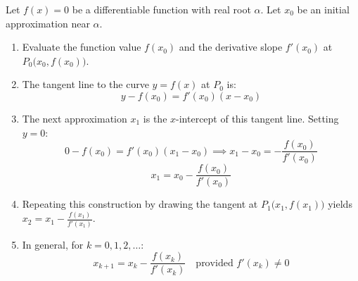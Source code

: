 \begin{theorembox}
Let $f(x) = 0$ be a differentiable function with real root $\alpha$. Let $x_0$ be an initial approximation near $\alpha$.
\begin{enumerate}
    \item Evaluate the function value $f(x_0)$ and the derivative slope $f'(x_0)$ at $P_0\big(x_0, f(x_0)\big)$.
    \item The tangent line to the curve $y = f(x)$ at $P_0$ is:
    \begin{equation}
        y - f(x_0) = f'(x_0)(x - x_0)
    \end{equation}
    \item The next approximation $x_1$ is the $x$-intercept of this tangent line. Setting $y = 0$:
    \begin{equation}
        0 - f(x_0) = f'(x_0)(x_1 - x_0) \implies x_1 - x_0 = -\frac{f(x_0)}{f'(x_0)}
    \end{equation}
    \begin{equation}
        \boxed{x_1 = x_0 - \frac{f(x_0)}{f'(x_0)}}
    \end{equation}
    \item Repeating this construction by drawing the tangent at $P_1\big(x_1, f(x_1)\big)$ yields $x_2 = x_1 - \frac{f(x_1)}{f'(x_1)}$.
    \item In general, for $k = 0, 1, 2, \dots$:
    \begin{equation}
        \boxed{x_{k+1} = x_k - \frac{f(x_k)}{f'(x_k)}} \quad \text{provided } f'(x_k) \ne 0
    \end{equation}
\end{enumerate}
\end{theorembox}


